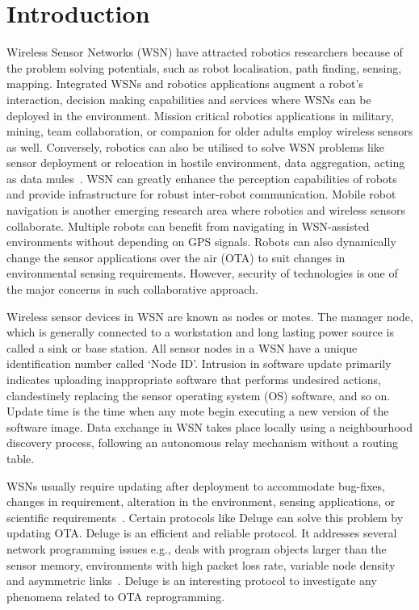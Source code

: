 \documentclass[conference,manuscript]{IEEEtran}
\begin{document}
\section{Introduction}
\label{sec:intro}

Wireless Sensor Networks (WSN) have attracted robotics
researchers because of the problem solving potentials, such as
robot localisation, path finding, sensing, mapping. Integrated
WSNs and robotics applications augment a robot's interaction,
decision making capabilities and services where WSNs can be
deployed in the environment. Mission critical robotics applications in military, mining, team collaboration, or companion
for older adults employ wireless sensors as well. Conversely,
robotics can also be utilised to solve WSN problems like
sensor deployment or relocation in hostile environment, data aggregation, acting as data mules~\cite{Shue13}.
WSN can greatly enhance
the perception capabilities of robots and provide infrastructure
for robust inter-robot communication. Mobile robot navigation is another emerging research area where robotics and
wireless sensors collaborate. Multiple robots can benefit from
navigating in WSN-assisted environments without depending
on GPS signals. Robots can also dynamically change the
sensor applications over the air (OTA) to suit changes
in environmental sensing requirements. However, security of
technologies is one of the major concerns in such collaborative
approach.

Wireless sensor devices in WSN are known as nodes or
motes. The manager node, which is generally connected to
a workstation and long lasting power source is called a sink
or base station. All sensor nodes in a WSN have a unique
identification number called `Node ID'. Intrusion in software
update primarily indicates uploading inappropriate software
that performs undesired actions, clandestinely replacing the
sensor operating system (OS) software, and so on. Update time
is the time when any mote begin executing a new version
of the software image. Data exchange in WSN takes place
locally using a neighbourhood discovery process, following
an autonomous relay mechanism without a routing table.

WSNs usually require updating after deployment to accommodate bug-fixes, changes in requirement, alteration in
the environment, sensing applications, or scientific requirements~\cite{ISI:000253439700120}.
Certain protocols like Deluge can solve this problem
by updating OTA. Deluge is an efficient and reliable protocol.
It addresses several network programming issues e.g., deals
with program objects larger than the sensor memory, environments with high packet loss rate, variable node density
and asymmetric links~\cite{1031506}.
Deluge is an interesting protocol
to investigate any phenomena related to OTA reprogramming.
\end{document}
